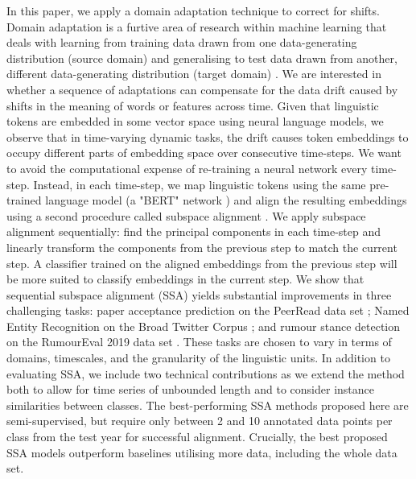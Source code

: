 \documentclass[letterpaper]{article} %
\begin{document}
In this paper, we apply a domain adaptation technique to correct for shifts. Domain adaptation is a furtive area of research within machine learning that deals with learning from training data drawn from one data-generating distribution (source domain) and generalising to test data drawn from another, different data-generating distribution (target domain) \cite{kouw2019review}. %
We are interested in whether a sequence of adaptations can compensate for the data drift caused by shifts in the meaning of words or features across time. Given that linguistic tokens are embedded in some vector space using neural language models, we observe that in time-varying dynamic tasks, the drift causes token embeddings to occupy different parts of embedding space over consecutive time-steps. We want to avoid the computational expense of re-training a neural network every time-step. Instead, in each time-step, we map linguistic tokens using the same pre-trained language model (a "BERT" network \cite{bert}) and align the resulting embeddings using a second procedure called subspace alignment \cite{fernando2013unsupervised}. We apply subspace alignment sequentially: find the principal components in each time-step and linearly transform the components from the previous step to match the current step. A classifier trained on the aligned embeddings from the previous step will be more suited to classify embeddings in the current step. We show that sequential subspace alignment (SSA) yields substantial improvements in three challenging tasks: paper acceptance prediction on the PeerRead data set \cite{kang18naacl}; Named Entity Recognition on the Broad Twitter Corpus \cite{derczynski:2016}; and rumour stance detection on the RumourEval 2019 data set \cite{rumour:19}. %
These tasks are chosen to vary in terms of domains, timescales, and the granularity of the linguistic units. %
In addition to evaluating SSA, we include two technical contributions as we extend the method both to allow for time series of unbounded length and to consider instance similarities between classes.
The best-performing SSA methods proposed here are semi-supervised, but require only between 2 and 10 annotated data points per class from the test year for successful alignment.
Crucially, the best proposed SSA models outperform baselines utilising more data, including the whole data set. 
\end{document}
